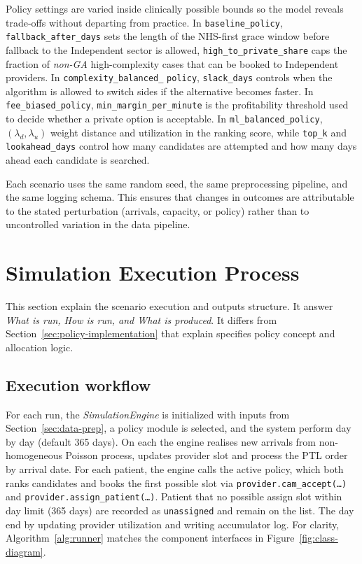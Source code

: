 \documentclass[ %
                    author={Nattanan Nawakitbamrung},
                supervisor={Dr. Sébastien Rochat},
                    degree={MSc},
                     title={Developing and Evaluating the Impact of a Single Patient Treatment List (PTL) for an NHS Integrated Care System},
                  subtitle={},
                      type={},
                      year={2025}]{dissertation}
\begin{document}
Policy settings are varied inside clinically possible bounds so the model reveals trade-offs without departing from practice. In \texttt{baseline\_policy}, \texttt{fallback\_after\_days} sets the length of the NHS-first grace window before fallback to the Independent sector is allowed, \texttt{high\_to\_private\_share} caps the fraction of \emph{non-GA} high-complexity cases that can be booked to Independent providers. In \texttt{complexity\_balanced\_} \texttt{policy}, \texttt{slack\_days} controls when the algorithm is allowed to switch sides if the alternative becomes faster. In \texttt{fee\_biased\_policy}, \texttt{min\_margin\_per\_minute} is the profitability threshold used to decide whether a private option is acceptable. In \texttt{ml\_balanced\_policy}, $(\lambda_d,\lambda_u)$ weight distance and utilization in the ranking score, while \texttt{top\_k} and \texttt{lookahead\_days} control how many candidates are attempted and how many days ahead each candidate is searched.

Each scenario uses the same random seed, the same preprocessing pipeline, and the same logging schema. This ensures that changes in outcomes are attributable to the stated perturbation (arrivals, capacity, or policy) rather than to uncontrolled variation in the data pipeline.

\section{Simulation Execution Process}
This section explain the scenario execution and outputs structure. It answer \emph{What is run, How is run, and What is produced}. It differs from Section~\ref{sec:policy-implementation} that explain specifies policy concept and allocation logic.

\subsection{Execution workflow}
For each run, the \textit{SimulationEngine} is initialized with inputs from Section~\ref{sec:data-prep}, a policy module is selected, and the system perform day by day (default 365 days). On each the engine realises new arrivals from non-homogeneous Poisson process, updates provider slot and process the PTL order by arrival date. For each patient, the engine calls the active policy, which both ranks candidates and books the first possible slot via \texttt{provider.cam\_accept(\dots)} and \texttt{provider.assign\_patient(\dots)}. Patient that no possible assign slot within day limit (365 days) are recorded as \texttt{unassigned} and remain on the list. The day end by updating provider utilization and writing accumulator log. For clarity, Algorithm~\ref{alg:runner} matches the component interfaces in Figure~\ref{fig:class-diagram}.
\end{document}
